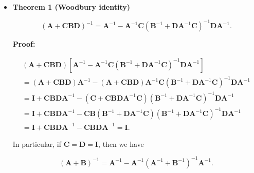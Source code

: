 \documentclass[10pt,b5paper,titlepage]{book}
\begin{document}
\begin{itemize}
    \item \textbf{Theorem 1 (Woodbury identity)}

        \begin{equation}
            (\mathbf{A} + \mathbf{C} \mathbf{B} \mathbf{D})^{-1} =
            \mathbf{A}^{-1} - \mathbf{A}^{-1} \mathbf{C} (\mathbf{B}^{-1} + \mathbf{D} \mathbf{A}^{-1} \mathbf{C})^{-1} \mathbf{D} \mathbf{A}^{-1}
        .\end{equation}

        \textbf{Proof:}

        \begin{equation}
            \begin{array}{l}
                (\mathbf{A} + \mathbf{C} \mathbf{B} \mathbf{D}) [\mathbf{A}^{-1} - \mathbf{A}^{-1} \mathbf{C} (\mathbf{B}^{-1} + \mathbf{D} \mathbf{A}^{-1} \mathbf{C})^{-1} \mathbf{D} \mathbf{A}^{-1}]\\
                = (\mathbf{A} + \mathbf{C} \mathbf{B} \mathbf{D}) \mathbf{A}^{-1} - (\mathbf{A} + \mathbf{C} \mathbf{B} \mathbf{D}) \mathbf{A}^{-1} \mathbf{C} ( \mathbf{B}^{-1} + \mathbf{D} \mathbf{A}^{-1} \mathbf{C})^{-1} \mathbf{D} \mathbf{A}^{-1}\\
                = \mathbf{I} + \mathbf{C} \mathbf{B} \mathbf{D} \mathbf{A}^{-1} - (\mathbf{C} + \mathbf{C} \mathbf{B} \mathbf{D} \mathbf{A}^{-1} \mathbf{C}) (\mathbf{B}^{-1} + \mathbf{D} \mathbf{A}^{-1} \mathbf{C})^{-1} \mathbf{D} \mathbf{A}^{-1}\\
                = \mathbf{I} + \mathbf{C} \mathbf{B} \mathbf{D} \mathbf{A}^{-1} - \mathbf{C} \mathbf{B} (\mathbf{B}^{-1} + \mathbf{D} \mathbf{A}^{-1} \mathbf{C}) (\mathbf{B}^{-1} + \mathbf{D} \mathbf{A}^{-1} \mathbf{C})^{-1} \mathbf{D} \mathbf{A}^{-1}\\
                = \mathbf{I} + \mathbf{C} \mathbf{B} \mathbf{D} \mathbf{A}^{-1} - \mathbf{C} \mathbf{B} \mathbf{D} \mathbf{A}^{-1} = \mathbf{I}.
            \end{array}
        \end{equation}

        In particular, if $\mathbf{C} = \mathbf{D} = \mathbf{I}$, then we have

        \begin{equation}
            (\mathbf{A} + \mathbf{B})^{-1} = \mathbf{A}^{-1} - \mathbf{A}^{-1} (\mathbf{A}^{-1} + \mathbf{B}^{-1})^{-1} \mathbf{A}^{-1}
        .\end{equation}


\end{itemize}
\end{document}
